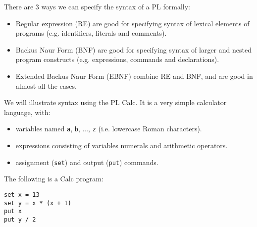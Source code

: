 \documentclass[a4paper, openany]{memoir}
\begin{document}
There are 3 ways we can specify the syntax of a PL formally:
\begin{itemize}
    \item Regular expression (RE) are good for specifying syntax of lexical elements of programs (e.g. identifiers, literals and comments).
    \item Backus Naur Form (BNF) are good for specifying syntax of larger and nested program constructs (e.g. expressions, commands and declarations).
    \item Extended Backus Naur Form (EBNF) combine RE and BNF, and are good in almost all the cases.
\end{itemize}

We will illustrate syntax using the PL Calc. It is a very simple calculator language, with:
\begin{itemize}
    \item variables named \texttt{a}, \texttt{b}, ..., \texttt{z} (i.e. lowercase Roman characters).
    \item expressions consisting of variables numerals and arithmetic operators.
    \item assignment (\texttt{set}) and output (\texttt{put}) commands.
\end{itemize}
The following is a Calc program:
\begin{lstlisting}[language=calc]
set x = 13
set y = x * (x + 1)
put x
put y / 2
\end{lstlisting}
\end{document}
